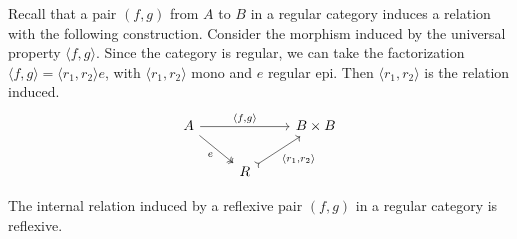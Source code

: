 Recall that a pair $(f,g)$ from $A$ to $B$ in a regular category induces a relation with the following construction. Consider the morphism induced by the universal property $\langle f,g \rangle$. Since the category is regular, we can take the factorization $\langle f,g \rangle = \langle r_1,r_2\rangle e$, with $\langle r_1,r_2\rangle$ mono and $e$ regular epi. Then $\langle r_1,r_2\rangle$ is the relation induced.
\[
\begin{tikzcd}
    A \arrow[rd, "e"', two heads] \arrow[rr, "{\langle f,g \rangle}"] &                                                   & B\times B \\
                                                                      & R \arrow[ru, "{\langle r_1, r_2 \rangle}"', tail] &          
    \end{tikzcd}
\]

\begin{mainbox}{}
    \begin{prop}\label{relation induced by a reflexive pair is reflexive}
        The internal relation induced by a reflexive pair $(f,g)$ in a regular category is reflexive.
    \end{prop}
\end{mainbox}

